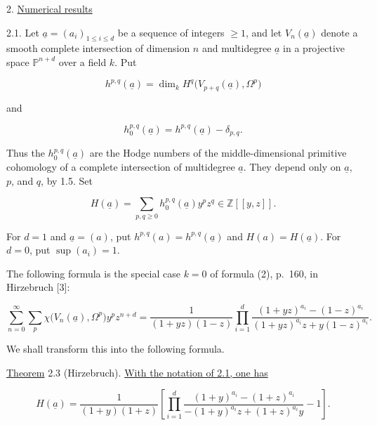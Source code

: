 2. \underline{Numerical results}

2.1. Let $\underline a=(a_i)_{1\leq i\leq d}$ be a sequence of integers
$\geq1$, and let $V_n(\underline a)$ denote a smooth complete intersection
of dimension $n$ and multidegree $\underline a$ in a projective space
$\mathbb P^{n+d}$ over a field $k$.  Put

\begin{equation*}
h^{p,q}(\underline a)
=\dim_k H^q\bigl(V_{p+q}(\underline a),\Omega^p\bigr)
\end{equation*}

and

\begin{equation*}
h_0^{p,q}(\underline a)=h^{p,q}(\underline a)-\delta_{p,q}.
\end{equation*}

Thus the $h_0^{p,q}(\underline a)$ are the Hodge numbers of the
middle-dimensional primitive cohomology of a complete intersection of
multidegree $\underline a$.  They depend only on $\underline a$, $p$, and
$q$, by 1.5.  Set

\begin{equation}\tag{2.1.1}
H(\underline a)=\sum_{p,q\geq0}h_0^{p,q}(\underline a)y^pz^q
\in\mathbb Z[[y,z]].
\end{equation}

For $d=1$ and $\underline a=(a)$, put
$h^{p,q}(a)=h^{p,q}(\underline a)$ and $H(a)=H(\underline a)$.  For $d=0$,
put $\sup(a_i)=1$.

The following formula is the special case $k=0$ of formula (2), p.~160,
in Hirzebruch [3]:


\begin{equation}\tag{2.2}
\sum_{n=0}^{\infty}\sum_p
\chi\bigl(V_n(\underline a),\Omega^p\bigr)y^pz^{n+d}
=\frac{1}{(1+yz)(1-z)}
\prod_{i=1}^d
\frac{(1+yz)^{a_i}-(1-z)^{a_i}}
{(1+yz)^{a_i}z+y(1-z)^{a_i}}.
\end{equation}

We shall transform this into the following formula.

\underline{Theorem} 2.3 (Hirzebruch). \underline{With the notation of 2.1,
one has}

\begin{equation*}
H(\underline a)=\frac{1}{(1+y)(1+z)}\left[
\prod_{i=1}^d
\frac{(1+y)^{a_i}-(1+z)^{a_i}}
{-(1+y)^{a_i}z+(1+z)^{a_i}y}-1\right].
\end{equation*}


